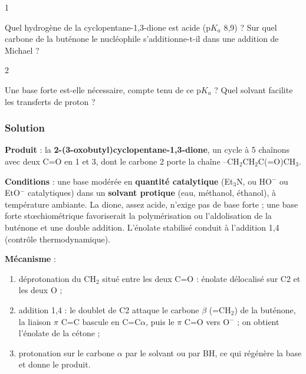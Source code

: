 \documentclass[11pt,a4paper]{article}
\providecommand{\tightlist}{\setlength{\itemsep}{0pt}\setlength{\parskip}{0pt}}
\begin{document}
\begin{indication}{1}

Quel hydrogène de la cyclopentane-1,3-dione est acide (p\(K_a\) 8,9) ? Sur quel carbone de la buténone le nucléophile s'additionne-t-il dans une addition de Michael ?

\end{indication}

\begin{indication}{2}

Une base forte est-elle nécessaire, compte tenu de ce p\(K_a\) ? Quel solvant facilite les transferts de proton ?

\end{indication}

\hypertarget{solution-47}{%
\subsubsection{Solution}\label{solution-47}}

\textbf{Produit} : la \textbf{2-\allowbreak{}(3-\allowbreak{}oxobutyl)cyclopentane-\allowbreak{}1,3-\allowbreak{}dione}, un cycle à 5 chaînons avec deux C=O en 1 et 3, dont le carbone 2 porte la chaîne --CH\(_2\)CH\(_2\)C(=O)CH\(_3\).

\textbf{Conditions} : une base modérée en \textbf{quantité catalytique} (Et\(_3\)N, ou HO\(^-\) ou EtO\(^-\) catalytiques) dans un \textbf{solvant protique} (eau, méthanol, éthanol), à température ambiante. La dione, assez acide, n'exige pas de base forte ; une base forte stœchiométrique favoriserait la polymérisation ou l'aldolisation de la buténone et une double addition. L'énolate stabilisé conduit à l'addition 1,4 (contrôle thermodynamique).

\textbf{Mécanisme} :

\begin{enumerate}
\def\labelenumi{\arabic{enumi}.}
\tightlist
\item
  déprotonation du CH\(_2\) situé entre les deux C=O : énolate délocalisé sur C2 et les deux O ;
\item
  addition 1,4 : le doublet de C2 attaque le carbone \(\beta\) (=CH\(_2\)) de la buténone, la liaison \(\pi\) C=C bascule en C=C\(\alpha\), puis le \(\pi\) C=O vers O\(^-\) ; on obtient l'énolate de la cétone ;
\item
  protonation sur le carbone \(\alpha\) par le solvant ou par BH, ce qui régénère la base et donne le produit.
\end{enumerate}
\end{document}
